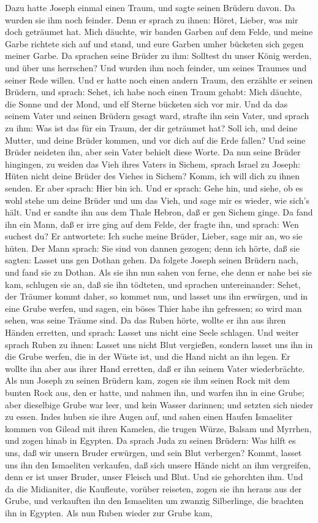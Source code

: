 \begin{schriftzitat}
Dazu hatte Joseph einmal einen Traum, und sagte seinen Brüdern davon. Da wurden sie ihm noch feinder. Denn er sprach zu ihnen: Höret, Lieber, was mir doch geträumet hat. Mich däuchte, wir banden Garben auf dem Felde, und meine Garbe richtete sich auf und stand, und eure Garben umher bücketen sich gegen meiner Garbe. Da sprachen seine Brüder zu ihm: Solltest du unser König werden, und über uns herrschen? Und wurden ihm noch feinder, um seines Traumes und seiner Rede willen. Und er hatte noch einen andern Traum, den erzählte er seinen Brüdern, und sprach: Sehet, ich habe noch einen Traum gehabt: Mich däuchte, die Sonne und der Mond, und elf Sterne bücketen sich vor mir. Und da das seinem Vater und seinen Brüdern gesagt ward, strafte ihn sein Vater, und sprach zu ihm: Was ist das für ein Traum, der dir geträumet hat? Soll ich, und deine Mutter, und deine Brüder kommen, und vor dich auf die Erde fallen? Und seine Brüder neideten ihn, aber sein Vater behielt diese Worte. Da nun seine Brüder hingingen, zu weiden das Vieh ihres Vaters in Sichem, sprach Israel zu Joseph: Hüten nicht deine Brüder des Viehes in Sichem? Komm, ich will dich zu ihnen senden. Er aber sprach: Hier bin ich. Und er sprach: Gehe hin, und siehe, ob es wohl stehe um deine Brüder und um das Vieh, und sage mir es wieder, wie sich’s hält. Und er sandte ihn aus dem Thale Hebron, daß er gen Sichem ginge. Da fand ihn ein Mann, daß er irre ging auf dem Felde, der fragte ihn, und sprach: Wen suchest du? Er antwortete: Ich suche meine Brüder, Lieber, sage mir an, wo sie hüten. Der Mann sprach: Sie sind von dannen gezogen; denn ich hörte, daß sie sagten: Lasset uns gen Dothan gehen. Da folgete Joseph seinen Brüdern nach, und fand sie zu Dothan. Als sie ihn nun sahen von ferne, ehe denn er nahe bei sie kam, schlugen sie an, daß sie ihn tödteten, und sprachen untereinander: Sehet, der Träumer kommt daher, so kommet nun, und lasset uns ihn erwürgen, und in eine Grube werfen, und sagen, ein böses Thier habe ihn gefressen; so wird man sehen, was seine Träume sind. Da das Ruben hörte, wollte er ihn aus ihren Händen erretten, und sprach: Lasset uns nicht eine Seele schlagen. Und weiter sprach Ruben zu ihnen: Lasset uns nicht Blut vergießen, sondern lasset uns ihn in die Grube werfen, die in der Wüste ist, und die Hand nicht an ihn legen. Er wollte ihn aber aus ihrer Hand erretten, daß er ihn seinem Vater wiederbrächte. Als nun Joseph zu seinen Brüdern kam, zogen sie ihm seinen Rock mit dem bunten Rock aus, den er hatte, und nahmen ihn, und warfen ihn in eine Grube; aber dieselbige Grube war leer, und kein Wasser darinnen; und setzten sich nieder zu essen. Indes huben sie ihre Augen auf, und sahen einen Haufen Ismaeliter kommen von Gilead mit ihren Kamelen, die trugen Würze, Balsam und Myrrhen, und zogen hinab in Egypten. Da sprach Juda zu seinen Brüdern: Was hilft es uns, daß wir unsern Bruder erwürgen, und sein Blut verbergen? Kommt, lasset uns ihn den Ismaeliten verkaufen, daß sich unsere Hände nicht an ihm vergreifen, denn er ist unser Bruder, unser Fleisch und Blut. Und sie gehorchten ihm. Und da die Midianiter, die Kaufleute, vorüber reiseten, zogen sie ihn heraus aus der Grube, und verkauften ihn den Ismaeliten um zwanzig Silberlinge, die brachten ihn in Egypten. Als nun Ruben wieder zur Grube kam, 
\end{schriftzitat}
